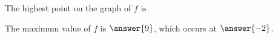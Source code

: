 \documentclass{ximera}
\begin{document}
\begin{example}
\begin{question}

The highest point on the graph of $f$ is


\begin{multipleChoice}
\end{multipleChoice}
\end{question}


\begin{question}


The maximum value of $f$ is $\answer{9}$, which occurs at $\answer{-2}$.
\end{question}







\end{example}
















\newpage
\end{document}

